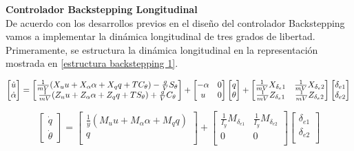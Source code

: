 \bigskip

\textbf{Controlador Backstepping Longitudinal}\\
De acuerdo con los desarrollos previos en el diseño del controlador Backstepping vamos a implementar la dinámica longitudinal de tres grados de libertad. 
Primeramente, se estructura la dinámica longitudinal en la representación mostrada en \ref{estructura backstepping 1}. 

\begin{equation}
    \begin{bmatrix}
        \dot u \\
        \dot \alpha
    \end{bmatrix}
    =
    \begin{bmatrix}
        \frac{1}{mV} (X_u u + X_\alpha \alpha + X_q q + T C_\theta) - \frac{g}{V} S_\theta \\
        \frac{1}{mV} (Z_u u + Z_\alpha \alpha + Z_q q + T S_\theta) + \frac{g}{V} C_\theta
    \end{bmatrix}
    +
    \begin{bmatrix}
    - \alpha & 0 \\
    u & 0
    \end{bmatrix}
    \begin{bmatrix}
      q  \\
      \theta
    \end{bmatrix}
    +
    \begin{bmatrix}
     \frac{1}{mV} X_{\delta_e1} & \frac{1}{mV} X_{\delta_e2} \\
     \frac{1}{mV} Z_{\delta_e1} & \frac{1}{mV} Z_{\delta_e2} \\
    \end{bmatrix}
    \begin{bmatrix}
        \delta_{e1} \\
        \delta_{e2} \\
    \end{bmatrix} \nonumber\\
\end{equation}

\begin{equation}
    \begin{bmatrix}
        \dot q \\
        \dot \theta
    \end{bmatrix}
    =
    \begin{bmatrix}
        \frac{1}{y} (M_u u + M_\alpha \alpha + M_q q) \\
        q \\
    \end{bmatrix}
    +
    \begin{bmatrix}
     \frac{1}{I_y} M_{\delta_{e1}} & \frac{1}{I_y} M_{\delta_{e2}} \\
      0 & 0 \\
    \end{bmatrix}
    \begin{bmatrix}
        \delta_{e1} \\
        \delta_{e2} \\
    \end{bmatrix}
\end{equation}


